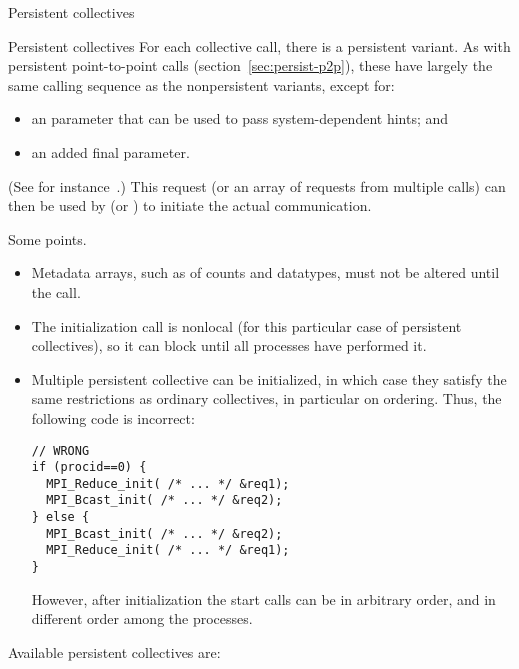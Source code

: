  {Persistent collectives}

\begin{mpifournote}{Persistent collectives}
For each collective call, there is a persistent variant.
As with persistent point-to-point calls (section~\ref{sec:persist-p2p}),
these have largely the same calling sequence as the nonpersistent variants,
except for:
\begin{itemize}
\item an  parameter that can be used to pass
  system-dependent hints; and
\item
  an added final  parameter.
\end{itemize}
(See for instance~.)
This request (or an array of requests from multiple calls) can then be used by
 (or )
to initiate the actual communication.


Some points.
\begin{itemize}
\item
  Metadata arrays, such as of counts and datatypes,
  must not be altered until the  call.
\item The initialization call is nonlocal (for this particular case of persistent collectives),
  so it can block until all processes have performed it.
\item Multiple persistent collective can be initialized, in which case
  they satisfy the same restrictions as ordinary collectives, in particular
  on ordering. Thus, the following code is incorrect:
\begin{lstlisting}
// WRONG
if (procid==0) {
  MPI_Reduce_init( /* ... */ &req1);
  MPI_Bcast_init( /* ... */ &req2);
} else {
  MPI_Bcast_init( /* ... */ &req2);
  MPI_Reduce_init( /* ... */ &req1);
}
\end{lstlisting}
However, after initialization the start calls can be in arbitrary order,
and in different order among the processes.
\end{itemize}

\begin{raggedlist} %
  Available persistent collectives are:
\end{raggedlist} %


\end{mpifournote}
